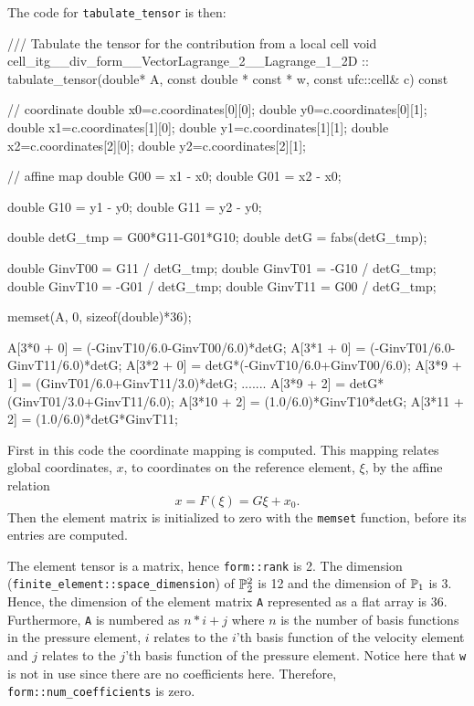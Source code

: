 The code for \texttt{tabulate\_tensor} is then: 
\begin{code}
/// Tabulate the tensor for the contribution from a local cell
void cell_itg__div_form__VectorLagrange_2__Lagrange_1_2D ::
     tabulate_tensor(double* A, const double * const * w,
                     const ufc::cell& c) const
{
  // coordinate
  double x0=c.coordinates[0][0]; double y0=c.coordinates[0][1];
  double x1=c.coordinates[1][0]; double y1=c.coordinates[1][1];
  double x2=c.coordinates[2][0]; double y2=c.coordinates[2][1];
  
  // affine map
  double G00 = x1 - x0;
  double G01 = x2 - x0;
  
  double G10 = y1 - y0;
  double G11 = y2 - y0;
  
  double detG_tmp = G00*G11-G01*G10;
  double detG = fabs(detG_tmp);
  
  double GinvT00 =  G11 / detG_tmp;
  double GinvT01 = -G10 / detG_tmp;
  double GinvT10 = -G01 / detG_tmp;
  double GinvT11 =  G00 / detG_tmp;
  
  
  memset(A, 0, sizeof(double)*36);
  
  A[3*0 + 0] = (-GinvT10/6.0-GinvT00/6.0)*detG;
  A[3*1 + 0] = (-GinvT01/6.0-GinvT11/6.0)*detG;
  A[3*2 + 0] = detG*(-GinvT10/6.0+GinvT00/6.0);
  A[3*9 + 1] = (GinvT01/6.0+GinvT11/3.0)*detG;
  .......
  A[3*9 + 2] = detG*(GinvT01/3.0+GinvT11/6.0);
  A[3*10 + 2] = (1.0/6.0)*GinvT10*detG;
  A[3*11 + 2] = (1.0/6.0)*detG*GinvT11;
}
\end{code}

First in this code the coordinate mapping is 
computed. 
This mapping relates global coordinates, $x$, to coordinates
on the reference element, $\xi$,  by the affine relation 
\[
x = F(\xi) = G \xi + x_0. 
\]
Then the element matrix is initialized to zero with the \texttt{memset}
function, before its entries are computed. 

The element tensor is a matrix, hence \texttt{form::rank} is 2.
The dimension (\texttt{finite\_element::space\_dimension}) 
of  $\P^2_2$ is 12 and the dimension of $\P_1$ is 3.    
Hence, the dimension of the element matrix \texttt{A} represented as a    
flat array is 36.   
Furthermore, \texttt{A} is numbered as $n*i + j$ where
$n$ is the number of basis functions in the pressure element, 
$i$ relates to the $i$'th basis function of the velocity element and
$j$ relates to the $j$'th basis function of the pressure element. 
Notice here that \texttt{w} is not in use since there are no coefficients here. 
Therefore, \texttt{form::num\_coefficients} is zero.


